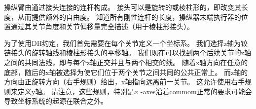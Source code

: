 
操纵臂由通过接头连接的连杆构成。 接头可以是旋转的或棱柱形的，即改变其长度，从而提供额外的自由度。 知道所有刚性连杆的长度，操纵器末端执行器的位置通过其关节角度和关节偏移量完全描述（用于棱柱形接头）。



为了使用DH约定，我们首先需要在每个关节定义一个坐标系。 我们选择z轴为铰链接头的旋转轴线和棱柱形接头的平移轴。 我们现在可以找到两个后续关节的z轴之间的共同法线，即与每个z轴正交并且与两个相交的线。 随着x轴方向在任意的底部，随后的x轴被选择为使它们位于两个关节之间共同的公共正常上。 而z轴的方向由正旋转方向（右手规则）给出，x轴指向远离前一关节。 这允许使用右手规则来定义y轴。 请注意，这些规则，特别是$ x $ -axes沿着commom正常的要求可能会导致坐标系统的起源在联合之外。 

